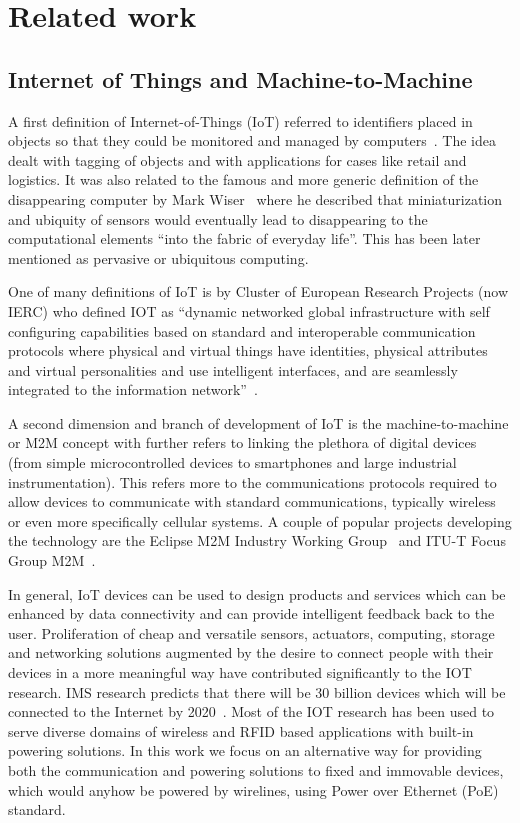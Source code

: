 \documentclass[draft,a4paper]{siamltex}
\begin{document}
\section{Related work}
\label{sec:related}

\subsection{Internet of Things and Machine-to-Machine}

A first definition of Internet-of-Things (IoT) referred to identifiers
placed in objects so that they could be monitored and managed by
computers~\cite{ashton2009internet}. The idea dealt with tagging of
objects and with applications for cases like retail and logistics. It
was also related to the famous and more generic definition of the
disappearing computer by Mark Wiser~\cite{weiser1991computer} where he
described that miniaturization and ubiquity of sensors would
eventually lead to disappearing to the computational elements ``into
the fabric of everyday life''.  This has been later mentioned as
pervasive or ubiquitous computing.

One of many definitions of IoT is by Cluster of European Research
Projects (now IERC) who defined IOT as ``dynamic networked global
infrastructure with self configuring capabilities based on standard
and interoperable communication protocols where physical and virtual
things have identities, physical attributes and virtual personalities
and use intelligent interfaces, and are seamlessly integrated to the
information network''~\cite{vermesan2011internet}.

A second dimension and branch of development of IoT is the
machine-to-machine or M2M concept with further refers to linking the
plethora of digital devices (from simple microcontrolled devices to
smartphones and large industrial instrumentation). This refers more to
the communications protocols required to allow devices to communicate
with standard communications, typically wireless or even more
specifically cellular systems.  A couple of popular projects
developing the technology are the Eclipse M2M Industry Working
Group~\cite{EclipseM2M} and ITU-T Focus Group M2M~\cite{ITU-T_FG_M2M}.

In general, IoT devices can be used to design products and services
which can be enhanced by
data connectivity and can provide intelligent feedback back to the user.
Proliferation of cheap and versatile sensors, actuators, computing, storage and
networking solutions augmented by the desire to connect people with their
devices in a more meaningful way have contributed significantly to the IOT
research. IMS research predicts that there will be 30 billion devices which will
be connected to the Internet by 2020~\cite{ABIresearch}. Most of the IOT
research has been used to serve diverse domains of wireless and RFID based
applications with built-in powering solutions. In this work we focus on an
alternative way for providing both the communication and powering solutions to
fixed and immovable devices, which would anyhow be powered by wirelines, using
Power over Ethernet (PoE) standard.
\end{document}
